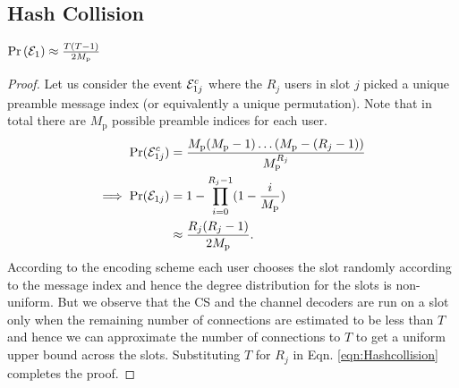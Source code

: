 \subsection{Hash Collision}
\begin{lemma}
$\mathrm{Pr} \left(\mathcal{E}_{1}\right)\approx \frac{T(T-1)}{2M_\mathrm{p}}$	
\label{lem:hashCollision}\\
\end{lemma}
\begin{proof}
Let us consider the event $\mathcal{E}_{1j}^c$ where the $R_j$ users in slot $j$ picked a unique preamble message index (or equivalently a unique permutation). Note that in total there are $M_\mathrm{p}$ possible preamble indices for each user.
\begin{align}
\mathrm{Pr}(\mathcal{E}_{1j}^c)&=\frac{M_\mathrm{p}(M_\mathrm{p}-1)\ldots(M_\mathrm{p}-(R_j-1))}{M_\mathrm{p}^{R_j}}\notag\\
\implies \mathrm{Pr}(\mathcal{E}_{1j})&=1-\prod_{i=0}^{R_j-1}(1-\frac{i}{M_\mathrm{p}})\notag\\
&\approx \frac{R_j(R_j-1)}{2M_\mathrm{p}}.\label{eqn:Hashcollision}
\end{align}
According to the encoding scheme each user chooses the slot randomly according to the message index and hence the degree distribution for the slots is non-uniform. But we observe that the CS and the channel decoders are run on a slot only when the remaining number of connections are estimated to be less than $T$ and hence we can approximate the number of connections to $T$ to get a uniform upper bound  across the slots. Substituting $T$ for $R_j$ in Eqn. \eqref{eqn:Hashcollision} completes the proof.
\end{proof}

